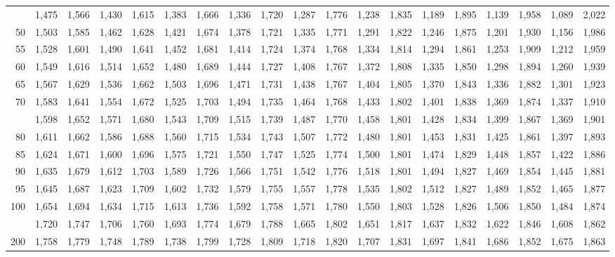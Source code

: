 \documentclass[12pt,a4paper]{article}
\begin{document}
{\begin{longtable}{@{\extracolsep{\fill}}rcccccccccccccccccc@{}}
\addlinespace[2pt]
45 & 1,475 & 1,566 & 1,430 & 1,615 & 1,383 & 1,666 & 1,336 & 1,720 & 1,287 & 1,776 & 1,238 & 1,835 & 1,189 & 1,895 & 1,139 & 1,958 & 1,089 & 2,022 \\
50 & 1,503 & 1,585 & 1,462 & 1,628 & 1,421 & 1,674 & 1,378 & 1,721 & 1,335 & 1,771 & 1,291 & 1,822 & 1,246 & 1,875 & 1,201 & 1,930 & 1,156 & 1,986 \\
55 & 1,528 & 1,601 & 1,490 & 1,641 & 1,452 & 1,681 & 1,414 & 1,724 & 1,374 & 1,768 & 1,334 & 1,814 & 1,294 & 1,861 & 1,253 & 1,909 & 1,212 & 1,959 \\
60 & 1,549 & 1,616 & 1,514 & 1,652 & 1,480 & 1,689 & 1,444 & 1,727 & 1,408 & 1,767 & 1,372 & 1,808 & 1,335 & 1,850 & 1,298 & 1,894 & 1,260 & 1,939 \\
65 & 1,567 & 1,629 & 1,536 & 1,662 & 1,503 & 1,696 & 1,471 & 1,731 & 1,438 & 1,767 & 1,404 & 1,805 & 1,370 & 1,843 & 1,336 & 1,882 & 1,301 & 1,923 \\
70 & 1,583 & 1,641 & 1,554 & 1,672 & 1,525 & 1,703 & 1,494 & 1,735 & 1,464 & 1,768 & 1,433 & 1,802 & 1,401 & 1,838 & 1,369 & 1,874 & 1,337 & 1,910 \\
\addlinespace[2pt]
75 & 1,598 & 1,652 & 1,571 & 1,680 & 1,543 & 1,709 & 1,515 & 1,739 & 1,487 & 1,770 & 1,458 & 1,801 & 1,428 & 1,834 & 1,399 & 1,867 & 1,369 & 1,901 \\
80 & 1,611 & 1,662 & 1,586 & 1,688 & 1,560 & 1,715 & 1,534 & 1,743 & 1,507 & 1,772 & 1,480 & 1,801 & 1,453 & 1,831 & 1,425 & 1,861 & 1,397 & 1,893 \\
85 & 1,624 & 1,671 & 1,600 & 1,696 & 1,575 & 1,721 & 1,550 & 1,747 & 1,525 & 1,774 & 1,500 & 1,801 & 1,474 & 1,829 & 1,448 & 1,857 & 1,422 & 1,886 \\
90 & 1,635 & 1,679 & 1,612 & 1,703 & 1,589 & 1,726 & 1,566 & 1,751 & 1,542 & 1,776 & 1,518 & 1,801 & 1,494 & 1,827 & 1,469 & 1,854 & 1,445 & 1,881 \\
95 & 1,645 & 1,687 & 1,623 & 1,709 & 1,602 & 1,732 & 1,579 & 1,755 & 1,557 & 1,778 & 1,535 & 1,802 & 1,512 & 1,827 & 1,489 & 1,852 & 1,465 & 1,877 \\
100 & 1,654 & 1,694 & 1,634 & 1,715 & 1,613 & 1,736 & 1,592 & 1,758 & 1,571 & 1,780 & 1,550 & 1,803 & 1,528 & 1,826 & 1,506 & 1,850 & 1,484 & 1,874 \\
\addlinespace[2pt]
150 & 1,720 & 1,747 & 1,706 & 1,760 & 1,693 & 1,774 & 1,679 & 1,788 & 1,665 & 1,802 & 1,651 & 1,817 & 1,637 & 1,832 & 1,622 & 1,846 & 1,608 & 1,862 \\
200 & 1,758 & 1,779 & 1,748 & 1,789 & 1,738 & 1,799 & 1,728 & 1,809 & 1,718 & 1,820 & 1,707 & 1,831 & 1,697 & 1,841 & 1,686 & 1,852 & 1,675 & 1,863 \\
\end{longtable}
}
\end{document}

